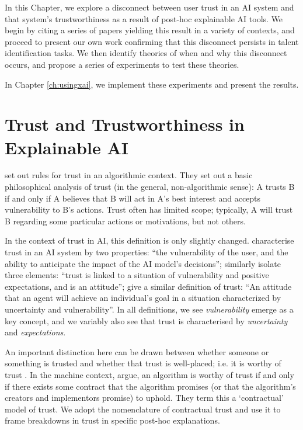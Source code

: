 In this Chapter, we explore a disconnect between user trust in an AI system and that system's trustworthiness as a result of post-hoc explainable AI tools. We begin by citing a series of papers yielding this result in a variety of contexts, and proceed to present our own work confirming that this disconnect persists in talent identification tasks. We then identify theories of when and why this disconnect occurs, and propose a series of experiments to test these theories. 

In Chapter \ref{ch:usingxai}, we implement these experiments and present the results.

\section{Trust and Trustworthiness in Explainable AI}
\textcite{jacovi_formalizing_2021} set out rules for trust in an algorithmic context. They set out a basic philosophical analysis of trust (in the general, non-algorithmic sense): A trusts B if and only if A believes that B will act in A's best interest and accepts vulnerability to B's actions. Trust often has limited scope; typically, A will trust B regarding some particular actions or motivations, but not others.

In the context of trust in AI, this definition is only slightly changed. \textcite{jacovi_formalizing_2021} characterise trust in an AI system by two properties: ``the vulnerability of the user, and the ability to anticipate the impact of the AI model's decisions''; \textcite{vereschak_how_2021} similarly isolate three elements: ``trust is linked to a situation of vulnerability and positive expectations, and is an attitude''; \textcite{lee_trust_2004} give a similar definition of trust: ``An attitude that an agent will achieve an individual's goal in a situation characterized by uncertainty and vulnerability''. In all definitions, we see \emph{vulnerability} emerge as a key concept, and we variably also see that trust is characterised by \emph{uncertainty} and \emph{expectations}.

An important distinction here can be drawn between whether someone or something is trusted and whether that trust is well-placed; i.e. it is worthy of trust \cite{hardin_trust_2002}. In the machine context, \textcite{jacovi_formalizing_2021} argue, an algorithm is worthy of trust if and only if there exists some contract that the algorithm promises (or that the algorithm's creators and implementors promise) to uphold. They term this a `contractual' model of trust. We adopt the nomenclature of contractual trust and use it to frame breakdowns in trust in specific post-hoc explanations.

